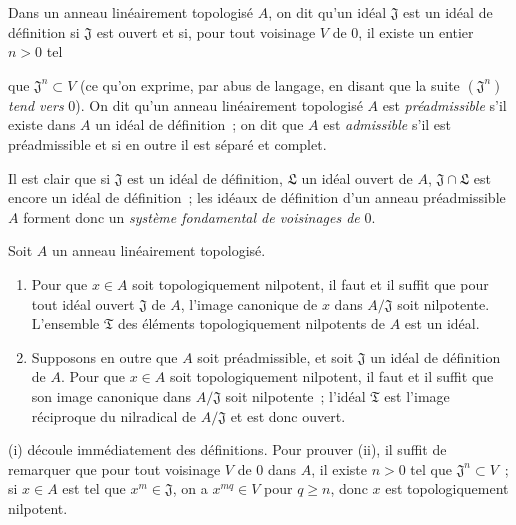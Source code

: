 \begin{definition}[7.1.2]
\label{0.7.1.2-fr}
Dans un anneau linéairement topologisé $A$, on dit qu'un idéal $\mathfrak J$
est un \textup{idéal de définition} si $\mathfrak J$ est ouvert et si, pour tout
voisinage $V$ de $0$, il existe un entier $n>0$ tel


que $\mathfrak J^n\subset V$ \textup{(ce qu'on exprime, par abus de langage, en disant
que la suite $(\mathfrak J^n)$ \emph{tend vers} $0$)}. On dit qu'un anneau linéairement
topologisé $A$ est \emph{préadmissible} s'il existe dans $A$ un idéal de définition~;
on dit que $A$ est \emph{admissible} s'il est préadmissible et si en outre il est
séparé et complet.
\end{definition}

Il est clair que si $\mathfrak J$ est un idéal de définition, $\mathfrak L$ un
idéal ouvert de $A$, $\mathfrak J\cap\mathfrak L$ est encore un idéal de
définition~; les idéaux de définition d'un anneau préadmissible $A$ forment
donc un \emph{système fondamental de voisinages de} $0$.

\begin{lemma}[7.1.3]
\label{0.7.1.3-fr}
Soit $A$ un anneau linéairement topologisé.
\begin{enumerate}
  \item[{\upshape(i)}] Pour que $x\in A$ soit topologiquement nilpotent, il
    faut et il suffit que pour tout idéal ouvert $\mathfrak J$ de $A$, l'image
    canonique de $x$ dans $A/\mathfrak J$ soit nilpotente. L'ensemble
    $\mathfrak T$ des éléments topologiquement nilpotents de $A$ est un idéal.
  \item[{\upshape(ii)}] Supposons en outre que $A$ soit préadmissible, et soit
    $\mathfrak J$ un idéal de définition de $A$. Pour que $x\in A$ soit
    topologiquement nilpotent, il faut et il suffit que son image canonique dans
    $A/\mathfrak J$ soit nilpotente~; l'idéal $\mathfrak T$ est l'image
    réciproque du nilradical de $A/\mathfrak J$ et est donc ouvert.
\end{enumerate}
\end{lemma}

(i) découle immédiatement des définitions. Pour prouver (ii), il suffit de
remarquer que pour tout voisinage $V$ de $0$ dans $A$, il existe $n>0$ tel que
$\mathfrak J^n\subset V$~; si $x\in A$ est tel que $x^m\in\mathfrak J$, on a
$x^{mq}\in V$ pour $q\geq n$, donc $x$ est topologiquement nilpotent.

